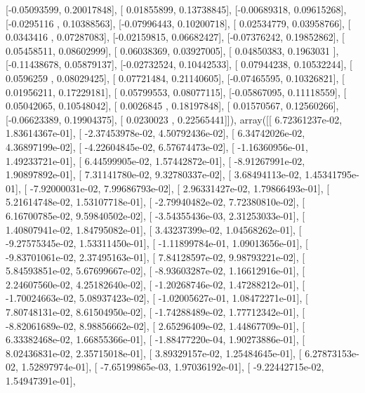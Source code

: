 \documentclass{article}
\begin{document}
       [-0.05093599,  0.20017848],
       [ 0.01855899,  0.13738845],
       [-0.00689318,  0.09615268],
       [-0.0295116 ,  0.10388563],
       [-0.07996443,  0.10200718],
       [ 0.02534779,  0.03958766],
       [ 0.0343416 ,  0.07287083],
       [-0.02159815,  0.06682427],
       [-0.07376242,  0.19852862],
       [ 0.05458511,  0.08602999],
       [ 0.06038369,  0.03927005],
       [ 0.04850383,  0.1963031 ],
       [-0.11438678,  0.05879137],
       [-0.02732524,  0.10442533],
       [ 0.07944238,  0.10532244],
       [ 0.0596259 ,  0.08029425],
       [ 0.07721484,  0.21140605],
       [-0.07465595,  0.10326821],
       [ 0.01956211,  0.17229181],
       [ 0.05799553,  0.08077115],
       [-0.05867095,  0.11118559],
       [ 0.05042065,  0.10548042],
       [ 0.0026845 ,  0.18197848],
       [ 0.01570567,  0.12560266],
       [-0.06623389,  0.19904375],
       [ 0.0230023 ,  0.22565441]]), array([[  6.72361237e-02,   1.83614367e-01],
       [ -2.37453978e-02,   4.50792436e-02],
       [  6.34742026e-02,   4.36897199e-02],
       [ -4.22604845e-02,   6.57674473e-02],
       [ -1.16360956e-01,   1.49233721e-01],
       [  6.44599905e-02,   1.57442872e-01],
       [ -8.91267991e-02,   1.90897892e-01],
       [  7.31141780e-02,   9.32780337e-02],
       [  3.68494113e-02,   1.45341795e-01],
       [ -7.92000031e-02,   7.99686793e-02],
       [  2.96331427e-02,   1.79866493e-01],
       [  5.21614748e-02,   1.53107718e-01],
       [ -2.79940482e-02,   7.72380810e-02],
       [  6.16700785e-02,   9.59840502e-02],
       [ -3.54355436e-03,   2.31253033e-01],
       [  1.40807941e-02,   1.84795082e-01],
       [  3.43237399e-02,   1.04568262e-01],
       [ -9.27575345e-02,   1.53311450e-01],
       [ -1.11899784e-01,   1.09013656e-01],
       [ -9.83701061e-02,   2.37495163e-01],
       [  7.84128597e-02,   9.98793221e-02],
       [  5.84593851e-02,   5.67699667e-02],
       [ -8.93603287e-02,   1.16612916e-01],
       [  2.24607560e-02,   4.25182640e-02],
       [ -1.20268746e-02,   1.47288212e-01],
       [ -1.70024663e-02,   5.08937423e-02],
       [ -1.02005627e-01,   1.08472271e-01],
       [  7.80748131e-02,   8.61504950e-02],
       [ -1.74288489e-02,   1.77712342e-01],
       [ -8.82061689e-02,   8.98856662e-02],
       [  2.65296409e-02,   1.44867709e-01],
       [  6.33382468e-02,   1.66855366e-01],
       [ -1.88477220e-04,   1.90273886e-01],
       [  8.02436831e-02,   2.35715018e-01],
       [  3.89329157e-02,   1.25484645e-01],
       [  6.27873153e-02,   1.52897974e-01],
       [ -7.65199865e-03,   1.97036192e-01],
       [ -9.22442715e-02,   1.54947391e-01],
\end{document}
